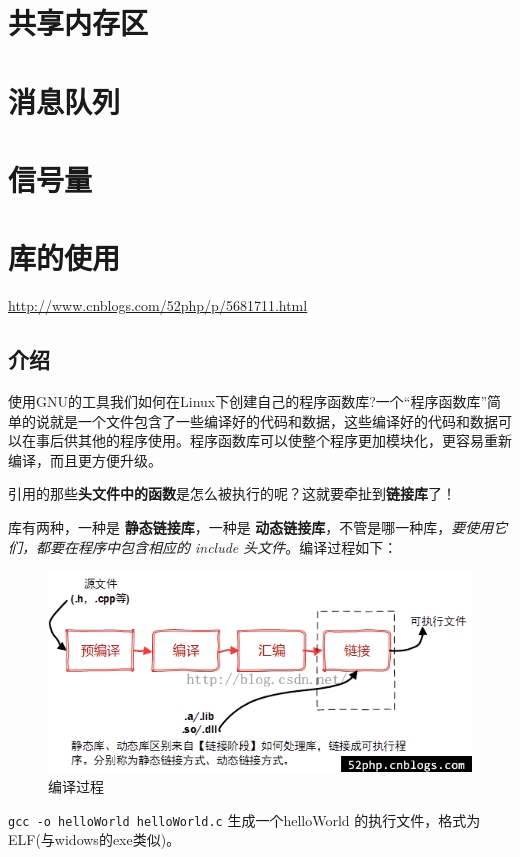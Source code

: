 \documentclass[UTF8,a4paper,12pt]{ctexbook}
\begin{document}
	\section{共享内存区}
	
	\section{消息队列}
	
	\section{信号量}
	
	\section{库的使用}
		\url{http://www.cnblogs.com/52php/p/5681711.html}
		\subsection{介绍}
			使用GNU的工具我们如何在Linux下创建自己的程序函数库?一个“程序函数库”简单的说就是一个文件包含了一些编译好的代码和数据，这些编译好的代码和数据可以在事后供其他的程序使用。程序函数库可以使整个程序更加模块化，更容易重新编译，而且更方便升级。  
			
			引用的那些\textbf{头文件中的函数}是怎么被执行的呢？这就要牵扯到\textbf{链接库}了！
			
			库有两种，一种是 \textbf{静态链接库}，一种是 \textbf{动态链接库}，不管是哪一种库，\textit{要使用它们，都要在程序中包含相应的 include 头文件}。编译过程如下：
			
			\begin{figure}[h]
				\centering
				\includegraphics[scale = 0.7]{compileProcess.png}
				\caption{编译过程}
			\end{figure}
			
			\verb|gcc -o helloWorld helloWorld.c| 生成一个helloWorld 的执行文件，格式为ELF(与widows的exe类似)。
			
\end{document}
